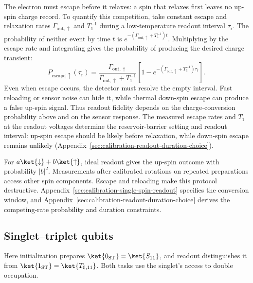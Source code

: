 The electron must escape before it relaxes: a spin that relaxes first
leaves no up-spin charge record. To quantify this competition, take
constant escape and relaxation rates
$\Gamma_{\mathrm{out},\uparrow}$ and $T_1^{-1}$
during a low-temperature readout interval $\tau_{\mathrm r}$.
The probability of neither event by time $t$ is
$e^{-(\Gamma_{\mathrm{out},\uparrow}+T_1^{-1})t}$.
Multiplying by the escape rate and integrating gives the probability
of producing the desired charge transient:
\begin{equation}
  P_{\mathrm{escape}|\uparrow}(\tau_{\mathrm r})
    =\frac{\Gamma_{\mathrm{out},\uparrow}}
           {\Gamma_{\mathrm{out},\uparrow}+T_1^{-1}}
      \left[1-e^{-(\Gamma_{\mathrm{out},\uparrow}+T_1^{-1})\tau_{\mathrm r}}\right].
  \label{eq:readout-competing-rates}
\end{equation}
Even when escape occurs, the detector must resolve the empty interval.
Fast reloading or sensor noise can hide it, while thermal down-spin
escape can produce a false up-spin signal.
Thus readout fidelity depends on the charge-conversion probability
above and on the sensor response. The measured escape rates and
$T_1$ at the readout voltages determine the reservoir-barrier setting
and readout interval: up-spin escape should be likely before
relaxation, while down-spin escape remains unlikely
(Appendix~\ref{sec:calibration-readout-duration-choice}).

For $a\ket{\downarrow}+b\ket{\uparrow}$, ideal readout gives the
up-spin outcome with probability $|b|^2$. Measurements after
calibrated rotations on repeated preparations access other spin
components. Escape and reloading make this protocol destructive.
Appendix~\ref{sec:calibration-single-spin-readout} specifies the
conversion window, and Appendix~\ref{sec:calibration-readout-duration-choice}
derives the competing-rate probability and duration constraints.

\subsection{Singlet--triplet qubits}
\label{sec:st-spam}
\label{sec:pauli-blockade-readout}

Here initialization prepares $\ket{0_{\mathrm{ST}}}=\ket{S_{11}}$,
and readout distinguishes it from $\ket{1_{\mathrm{ST}}}=\ket{T_{0,11}}$.
Both tasks use the singlet's access to double occupation.

